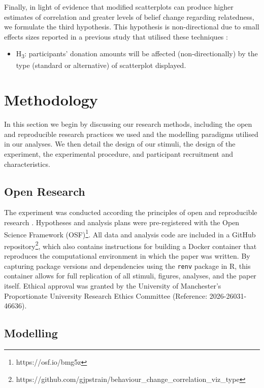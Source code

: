 \documentclass[
  authoryear,
  preprint,
  3p]{elsarticle}
\providecommand{\tightlist}{%
  \setlength{\itemsep}{0pt}\setlength{\parskip}{0pt}}
\begin{document}
Finally, in light of evidence that modified scatterplots can produce
higher estimates of correlation and greater levels of belief change
regarding relatedness, we formulate the third hypothesis. This
hypothesis is non-directional due to small effects sizes reported in a
previous study that utilised these techniques
\citep{strain_2024, strain_2025}:

\begin{itemize}
\tightlist
\item
  H\textsubscript{3}: participants' donation amounts will be affected
  (non-directionally) by the type (standard or alternative) of
  scatterplot displayed.
\end{itemize}

\section{Methodology}\label{sec-methods}

In this section we begin by discussing our research methods, including
the open and reproducible research practices we used and the modelling
paradigms utilised in our analyses. We then detail the design of our
stimuli, the design of the experiment, the experimental procedure, and
participant recruitment and characteristics.

\subsection{Open Research}\label{sec-open-research}

The experiment was conducted according the principles of open and
reproducible research \citep{ayris_2018}. Hypotheses and analysis plans
were pre-registered with the Open Science Framework (OSF)\footnote{https://osf.io/bmg5z}.
All data and analysis code are included in a GitHub
repository\footnote{https://github.com/gjpstrain/behaviour\_change\_correlation\_viz\_type},
which also contains instructions for building a Docker container
\citep{boettiger_2015} that reproduces the computational environment in
which the paper was written. By capturing package versions and
dependencies using the \texttt{renv} package \citep{ushey_2026} in R,
this container allows for full replication of all stimuli, figures,
analyses, and the paper itself. Ethical approval was granted by the
University of Manchester's Proportionate University Research Ethics
Committee (Reference: 2026-26031-46636).

\subsection{Modelling}\label{sec-modelling}
\end{document}
